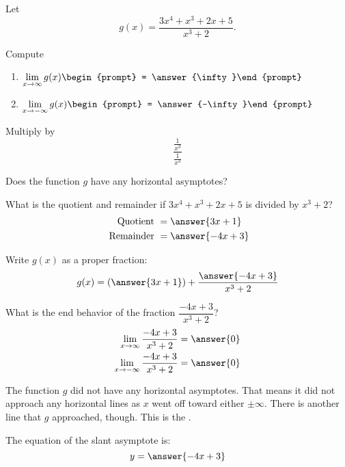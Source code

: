 \documentclass{ximera}
\author{Bobby Ramsey}
\begin{document}
\begin{exercise}
	Let \[ g(x) = \frac{3x^4+x^3+2x+5}{x^3+2}. \]
	
	Compute

	\begin{enumerate}
		\item $\displaystyle \lim_{x\to \infty} g(x) \begin{prompt} = \answer{\infty}\end{prompt}$
		\item $\displaystyle \lim_{x\to -\infty}g(x) \begin{prompt} = \answer{-\infty}\end{prompt}$
	\end{enumerate}

	\begin{hint}
		Multiply by \[\frac{\frac{1}{x^3}}{\frac{1}{x^3}}\]
	\end{hint}

	\begin{exercise}
		Does the function $g$ have any horizontal asymptotes?
		\begin{multipleChoice}
		\end{multipleChoice}
		
		\begin{exercise}
			What is the quotient and remainder if $3x^4+x^3+2x+5$ is divided by $x^3+2$?
			\begin{align*}
				\text{ Quotient } &= \answer{3x+1}\\
				\text{ Remainder } &= \answer{-4x+3}	
			\end{align*}
			\begin{exercise}
				Write $g(x)$ as a proper fraction:
				\[ g(x) = \left( \answer{3x+1} \right) + \frac{\answer{-4x+3}}{x^3+2} \]
				\begin{exercise}
					What is the end behavior of the fraction $\dfrac{-4x+3}{x^3+2}$?
					\begin{align*}
						\lim_{x\to \infty} \frac{-4x+3}{x^3+2} &= \answer{0} \\
						\lim_{x\to -\infty} \frac{-4x+3}{x^3+2} &= \answer{0} \\
					\end{align*}
					\begin{exercise}
						The function $g$ did not have any horizontal asymptotes.  That means it did not approach any horizontal lines as $x$ went off toward either $\pm \infty$.
						There is another line that $g$ approached, though.  This is the .
						\begin{exercise}	
							The equation of the slant asymptote is:
							\[ y = \answer{-4x+3} \]
						\end{exercise}
					\end{exercise}
				\end{exercise}
			\end{exercise}
		\end{exercise}
	\end{exercise}
\end{exercise}
\end{document}
